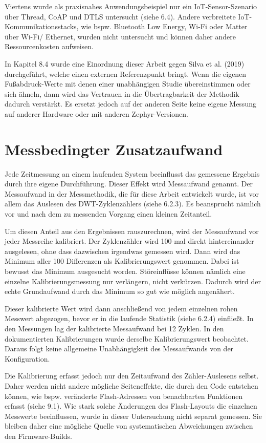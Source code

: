 Viertens wurde als praxisnahes Anwendungsbeispiel nur ein IoT-Sensor-Szenario über Thread, CoAP und DTLS untersucht (siehe 6.4). Andere verbreitete IoT-Kommunikationsstacks, wie bspw. Bluetooth Low Energy, Wi-Fi oder Matter über Wi-Fi/ Ethernet, wurden nicht untersucht und können daher andere Ressourcenkosten aufweisen.

In Kapitel 8.4 wurde eine Einordnung dieser Arbeit gegen Silva et al. (2019) durchgeführt, welche einen externen Referenzpunkt bringt. Wenn die eigenen Fußabdruck-Werte mit denen einer unabhängigen Studie übereinstimmen oder sich ähneln, dann wird das Vertrauen in die Übertragbarkeit der Methodik dadurch verstärkt. Es ersetzt jedoch auf der anderen Seite keine eigene Messung auf anderer Hardware oder mit anderen Zephyr-Versionen.

\section{Messbedingter Zusatzaufwand}
Jede Zeitmessung an einem laufenden System beeinflusst das gemessene Ergebnis durch ihre eigene Durchführung. Dieser Effekt wird Messaufwand genannt. Der Messaufwand in der Messmethodik, die für diese Arbeit entwickelt wurde, ist vor allem das Auslesen des DWT-Zyklenzählers (siehe 6.2.3). Es beansprucht nämlich vor und nach dem zu messenden Vorgang einen kleinen Zeitanteil.

Um diesen Anteil aus den Ergebnissen rauszurechnen, wird der Messaufwand vor jeder Messreihe kalibriert. Der Zyklenzähler wird 100-mal direkt hintereinander ausgelesen, ohne dass dazwischen irgendwas gemessen wird. Dann wird das Minimum aller 100 Differenzen als Kalibrierungswert genommen. Dabei ist bewusst das Minimum ausgesucht worden. Störeinflüsse können nämlich eine einzelne Kalibrierungsmessung nur verlängern, nicht verkürzen. Dadurch wird der echte Grundaufwand durch das Minimum so gut wie möglich angenähert.

Dieser kalibrierte Wert wird dann anschließend von jedem einzelnen rohen Messwert abgezogen, bevor er in die laufende Statistik (siehe 6.2.4) einfließt. In den Messungen lag der kalibrierte Messaufwand bei 12 Zyklen. In den dokumentierten Kalibrierungen wurde derselbe Kalibrierungswert beobachtet. Daraus folgt keine allgemeine Unabhängigkeit des Messaufwands von der Konfiguration.

Die Kalibrierung erfasst jedoch nur den Zeitaufwand des Zähler-Auslesens selbst. Daher werden nicht andere mögliche Seiteneffekte, die durch den Code entstehen können, wie bspw. veränderte Flash-Adressen von benachbarten Funktionen erfasst (siehe 9.1). Wie stark solche Änderungen des Flash-Layouts die einzelnen Messwerte beeinflussen, wurde in dieser Untersuchung nicht separat gemessen. Sie bleiben daher eine mögliche Quelle von systematischen Abweichungen zwischen den Firmware-Builds.

